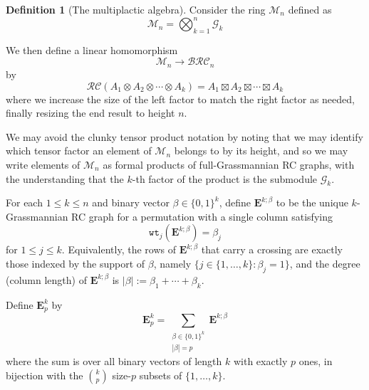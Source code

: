 \documentclass[a4paper,fleqn]{cas-sc}
\theoremstyle{definition}
\newtheorem{definition}[lemma]{Definition}
\theoremstyle{remark}
\numberwithin{equation}{subsection}
\newcommand{\wtt}{\mathtt{wt}}
\newcommand{\grass}{\mathcal{G}}
\newcommand{\hr}{\mathtt{ht}}
\newcommand{\BRC}{\mathcal{BRC}}
\newcommand{\RC}{\mathcal{RC}}
\begin{document}
\begin{definition}[The multiplactic algebra]
Consider the ring $\mathcal{M}_n$ defined as
$$\mathcal{M}_n = \bigotimes_{k=1}^n \grass_k$$

We then define a linear homomorphism
$$\mathcal{M}_n\to \BRC_n$$
by
$$\RC(A_1\otimes A_2\otimes \cdots \otimes A_k) = A_1\boxtimes A_2\boxtimes \cdots \boxtimes A_k$$
where we increase the size of the left factor to match the right factor as needed, finally resizing the end result to height $n$.

We may avoid the clunky tensor product notation by noting that we may identify which tensor factor an element of $\mathcal{M}_n$ belongs to by its height, and so we may write elements of $\mathcal{M}_n$ as formal products of full-Grassmannian RC graphs, with the understanding that the $k$-th factor of the product is the submodule $\grass_k$.

For each $1\leq k\leq n$ and binary vector $\beta\in\{0,1\}^k$, define $\mathbf{E}^{k;\beta}$ to be the unique $k$-Grassmannian RC graph for a permutation with a single column satisfying
$$\wtt_j(\mathbf{E}^{k;\beta}) = \beta_j$$
for $1\leq j\leq k$. Equivalently, the rows of $\mathbf{E}^{k;\beta}$ that carry a crossing are exactly those indexed by the support of $\beta$, namely $\{j\in\{1,\ldots,k\}:\beta_j=1\}$, and the degree (column length) of $\mathbf{E}^{k;\beta}$ is $|\beta|:=\beta_1+\cdots+\beta_k$.

Define $\mathbf{E}_{p}^k$ by
$$\mathbf{E}_{p}^k = \sum_{\substack{\beta\in\{0,1\}^k\\ |\beta|=p}} \mathbf{E}^{k;\beta}$$
where the sum is over all binary vectors of length $k$ with exactly $p$ ones, in bijection with the $\binom{k}{p}$ size-$p$ subsets of $\{1,\ldots,k\}$.
\end{definition}
\end{document}
